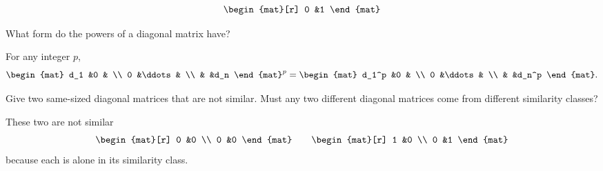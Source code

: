 \begin{exercises}
\begin{answer}
\begin{exparts}
\begin{equation*}
\begin{mat}[r]
               0  &1
            \end{mat}
          \end{equation*}
      \end{exparts}
    \end{answer}
  \recommended \item \label{exer:PowersOfDiags}
    What form do the powers of a diagonal matrix have?
    \begin{answer}
      For any integer \( p \),
      \begin{equation*}
        \begin{mat}
          d_1  &0      &   \\
          0    &\ddots &   \\
               &       &d_n
        \end{mat}^p=
        \begin{mat}
          d_1^p  &0      &   \\
          0      &\ddots &   \\
                 &       &d_n^p
        \end{mat}.
     \end{equation*} 
    \end{answer}
  \item 
     Give two same-sized diagonal matrices that are not similar.
     Must any two different diagonal matrices come from different similarity
     classes?
     \begin{answer}
       These two are not similar 
       \begin{equation*}
          \begin{mat}[r]
             0  &0  \\
             0  &0
          \end{mat}
          \qquad
          \begin{mat}[r]
             1  &0  \\
             0  &1
          \end{mat}
       \end{equation*}
       because each is alone in its similarity class.


\end{answer}
\end{exercises}
